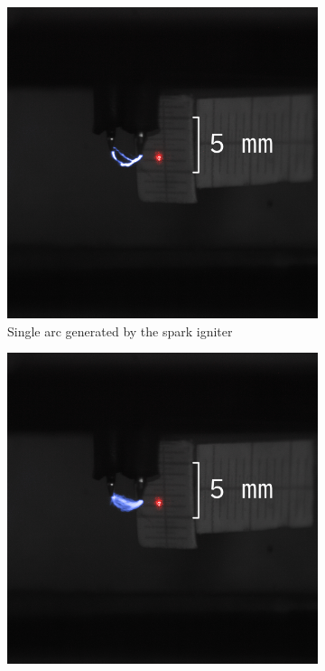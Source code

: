             \begin{figure}[h]
                \centering
                \begin{subfigure}[t]{0.47\textwidth}
                    \centering
                    \includegraphics[]{assets/3 design/sparkAlignment_one.jpg}
                    \caption{Single arc generated by the spark igniter}
                    \label{fig:sparkAlignment_one}
                \end{subfigure}
                \hfill
                \begin{subfigure}[t]{0.47\textwidth}
                    \centering
                    \includegraphics[]{assets/3 design/sparkAlignment.jpg}

\end{subfigure}
\end{figure}
